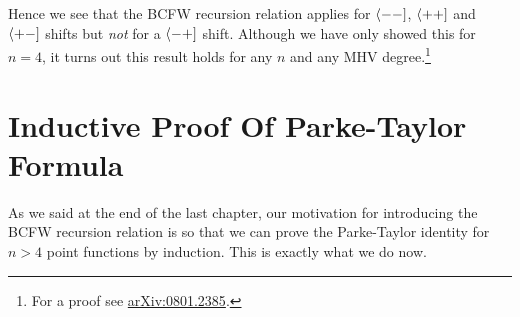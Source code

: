 Hence we see that the BCFW recursion relation applies for $\langle -- ]$, $\langle ++ ]$ and $\langle +-]$ shifts but \textit{not} for a $\langle -+]$ shift. Although we have only showed this for $n=4$, it turns out this result holds for any $n$ and any MHV degree.\footnote{For a proof see \href{https://arxiv.org/pdf/0801.2385.pdf}{arXiv:0801.2385}.}

\section{Inductive Proof Of Parke-Taylor Formula}

As we said at the end of the last chapter, our motivation for introducing the BCFW recursion relation is so that we can prove the Parke-Taylor identity for $n>4$ point functions by induction. This is exactly what we do now. 

